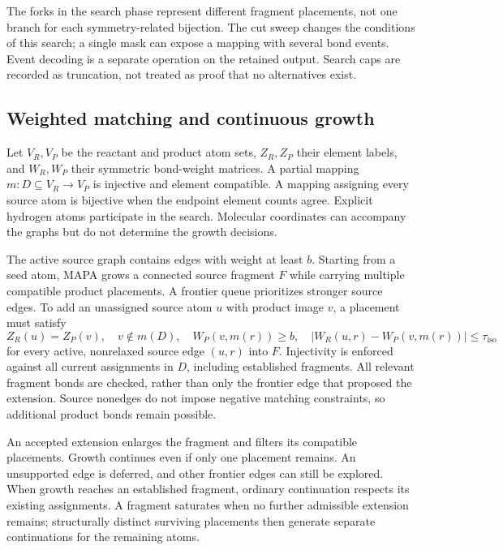 The forks in the search phase represent different fragment placements, not one branch for each symmetry-related bijection. The cut sweep changes the conditions of this search; a single mask can expose a mapping with several bond events. Event decoding is a separate operation on the retained output. Search caps are recorded as truncation, not treated as proof that no alternatives exist.

\subsection{Weighted matching and continuous growth}

Let $V_R,V_P$ be the reactant and product atom sets, $Z_R,Z_P$ their element labels, and $W_R,W_P$ their symmetric bond-weight matrices. A partial mapping $m:D\subseteq V_R\rightarrow V_P$ is injective and element compatible. A mapping assigning every source atom is bijective when the endpoint element counts agree. Explicit hydrogen atoms participate in the search. Molecular coordinates can accompany the graphs but do not determine the growth decisions.

The active source graph contains edges with weight at least $b$. Starting from a seed atom, MAPA grows a connected source fragment $F$ while carrying multiple compatible product placements. A frontier queue prioritizes stronger source edges. To add an unassigned source atom $u$ with product image $v$, a placement must satisfy
\begin{equation}
 Z_R(u)=Z_P(v),\quad v\notin m(D),\quad
 W_P(v,m(r))\geq b,\quad
 |W_R(u,r)-W_P(v,m(r))|\leq\tau_{\mathrm{iso}}
 \label{eq:match}
\end{equation}
for every active, nonrelaxed source edge $(u,r)$ into $F$. Injectivity is enforced against all current assignments in $D$, including established fragments. All relevant fragment bonds are checked, rather than only the frontier edge that proposed the extension. Source nonedges do not impose negative matching constraints, so additional product bonds remain possible.

An accepted extension enlarges the fragment and filters its compatible placements. Growth continues even if only one placement remains. An unsupported edge is deferred, and other frontier edges can still be explored. When growth reaches an established fragment, ordinary continuation respects its existing assignments. A fragment saturates when no further admissible extension remains; structurally distinct surviving placements then generate separate continuations for the remaining atoms.

